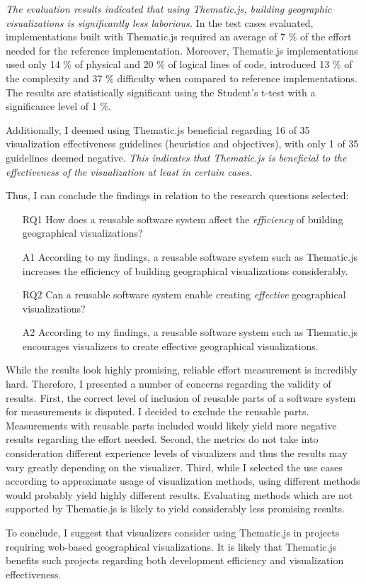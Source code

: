 \emph{The evaluation results indicated that using Thematic.js, building geographic visualizations is significantly less laborious.} In the test cases evaluated, implementations built with Thematic.js required an average of 7 \% of the effort needed for the reference implementation. Moreover, Thematic.js implementations used only 14 \% of physical and 20 \% of logical lines of code, introduced 13 \% of the complexity and 37 \% difficulty when compared to reference implementations. The results are statistically significant using the Student's t-test with a significance level of 1 \%.

Additionally, I deemed using Thematic.js beneficial regarding 16 of 35 visualization effectiveness guidelines (heuristics and objectives), with only 1 of 35 guidelines deemed negative. \emph{This indicates that Thematic.js is beneficial to the effectiveness of the visualization at least in certain cases.}

Thus, I can conclude the findings in relation to the research questions selected:%

\begin{enumerate}
	\item[RQ1] How does a reusable software system affect the \emph{efficiency} of building geographical visualizations?
	\item[A1] According to my findings, a reusable software system such as Thematic.js increases the efficiency of building geographical visualizations considerably.
\end{enumerate}
\begin{enumerate}
	\item[RQ2] Can a reusable software system enable creating \emph{effective} geographical visualizations?
	\item[A2] According to my findings, a reusable software system such as Thematic.js encourages visualizers to create effective geographical visualizations.
\end{enumerate}

While the results look highly promising, reliable effort measurement is incredibly hard. Therefore, I presented a number of concerns regarding the validity of results. First, the correct level of inclusion of reusable parts of a software system for measurements is disputed. I decided to exclude the reusable parts. Measurements with reusable parts included would likely yield more negative results regarding the effort needed. Second, the metrics do not take into consideration different experience levels of visualizers and thus the results may vary greatly depending on the visualizer. Third, while I selected the use cases according to approximate usage of visualization methods, using different methods would probably yield highly different results. Evaluating methods which are not supported by Thematic.js is likely to yield considerably less promising results.

To conclude, I suggest that visualizers consider using Thematic.js in projects requiring web-based geographical visualizations. It is likely that Thematic.js benefits such projects regarding both development efficiency and visualization effectiveness.
